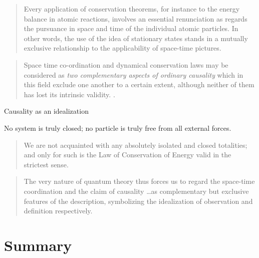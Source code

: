 \documentclass[fleqn]{beamer}
\begin{document}
\begin{frame}

  \begin{quote}
    Every application of conservation theorems, for instance to the
    energy balance in atomic reactions, involves an essential
    renunciation as regards the pursuance in space and time of the
    individual atomic particles.  In other words, the use of the idea
    of stationary states stands in a mutually exclusive relationship
    to the applicability of space-time pictures. \citep[p
    375]{faraday1932} \end{quote}


\end{frame}

\begin{frame}

  \begin{quote} Space time co-ordination and dynamical conservation
    laws may be considered as \emph{two complementary aspects of
      ordinary causality} which in this field exclude one another to a
    certain extent, although neither of them has lost its intrinsic
    validity. \citep[p 376]{faraday1932}. \end{quote}


\end{frame}

\begin{frame}{Causality as an idealization}

  No system is truly closed; no particle is truly free from all
  external forces.

  \medskip \begin{quote} We are not acquainted with any absolutely
    isolated and closed totalities; and only for such is the Law of
    Conservation of Energy valid in the strictest sense. \citep[p
    36]{hoff} \end{quote}

  \medskip \begin{quote} The very nature of quantum theory thus forces
    us to regard the space-time coordination and the claim of
    causality \dots as complementary but exclusive features of the
    description, symbolizing the idealization of observation and
    definition respectively. \citep[54]{bohr1927} \end{quote}

\end{frame}

\section{Summary}
\end{document}
